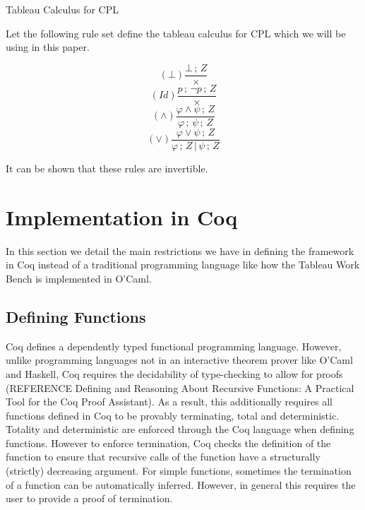 \documentclass{llncs}
\begin{document}
\begin{definition}{Tableau Calculus for CPL}\label{Tableau Calculus for CPL}

Let the following rule set define the tableau calculus for CPL which we will be
using in this paper.

\begin{multicols}{4}
\noindent
\begin{equation*}
(\bot)\frac{\bot\,;\,Z}{\times}
\end{equation*}
\begin{equation*}
(Id)\frac{p\,;\,\neg p\,;\,Z}{\times}
\end{equation*}
\begin{equation*}
(\wedge)\frac{\varphi \wedge \psi\,;\,Z}{\varphi\,;\,\psi\,;\,Z}
\end{equation*}
\begin{equation*}
(\vee)\frac{\varphi \vee \psi\,;\,Z}{\varphi\,;\,Z\,|\,\psi\,;\,Z}
\end{equation*}
\end{multicols}

It can be shown that these rules are invertible.
\end{definition}

\section{Implementation in Coq}

In this section we detail the main restrictions we have in defining the
framework in Coq instead of a traditional programming language like how the
Tableau Work Bench is implemented in O'Caml.

\subsection{Defining Functions}

Coq defines a dependently typed functional programming language. However,
unlike programming languages not in an interactive theorem prover like O'Caml
and Haskell, Coq requires the decidability of type-checking to allow for proofs
(REFERENCE Defining and Reasoning About Recursive Functions: A Practical Tool
for the Coq Proof Assistant). As a result, this additionally requires all
functions defined in Coq to be provably terminating, total and deterministic.
Totality and deterministic are enforced through the Coq language when defining
functions. However to enforce termination, Coq checks the definition of the
function to ensure that recursive calls of the function have a structurally
(strictly) decreasing argument. For simple functions, sometimes the termination
of a function can be automatically inferred. However, in general this requires
the user to provide a proof of termination.
\end{document}

